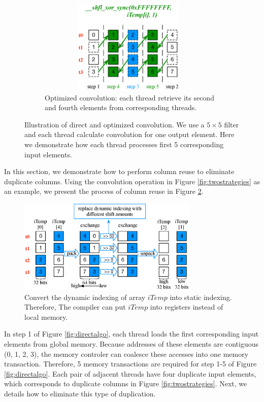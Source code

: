 \begin{figure}
\begin{subfigure}{0.3\textwidth}
		 \includegraphics[width=0.96\textwidth,height=4.5cm]{./figure/optalgo2.eps}
		 \caption{Optimized convolution: each thread retrieve its second and fourth elements from corresponding threads.}
		 \label{fig:optalgo2}
	\end{subfigure}
  \caption{Illustration of direct and optimized convolution. We use a $5 \times 5$ filter  and each thread calculate convolution for one output element. Here we demonstrate how each thread processes first 5 corresponding input elements.}
   \label{fig:corealgo}
\end{figure}

In this section, we demonstrate how to perform column reuse to eliminate duplicate columns. Using the convolution operation in Figure \ref{fig:twostrategies} as an example, we present the process of column reuse in Figure \ref{fig:corealgo}.%

\begin{figure}
	\centering
	\includegraphics[width=\columnwidth,height=4.5cm]{./figure/exchange.eps}
\caption{Convert the dynamic indexing of array $iTemp$ into static indexing. Therefore, The compiler can put $iTemp$ into registers instead of local memory.}
\label{fig:exchange}
\end{figure}


In step 1 of Figure \ref{fig:directalgo}, each thread loads the first corresponding input elements from global memory. Because
addresses of these elements are contiguous (0, 1, 2, 3), the memory controler can coalesce these accesses into one memory transaction. Therefore, 5
memory transactions are required for step 1-5 of Figure \ref{fig:directalgo}. Each pair of adjacent threads have four duplicate input
elements, which corresponds to duplicate columns in Figure \ref{fig:twostrategies}. Next, we details how to eliminate this type of
duplication.

